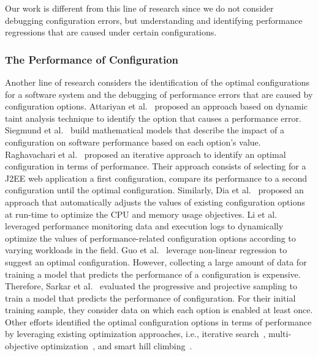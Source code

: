 Our work is different from this line of research since we do not consider debugging configuration errors, but understanding and identifying performance regressions that are caused under certain configurations.

\subsubsection{The Performance of Configuration} 

Another line of research considers the identification of the optimal configurations for a software system and the debugging of performance errors that are caused by configuration options. Attariyan et al.~\cite{RN3253} proposed an approach based on dynamic taint analysis technique to identify the option that causes a performance error. %
Siegmund et al.~\cite{RN2880} build mathematical models that describe the impact of a configuration on software performance based on each option's value. Raghavachari et al.~\cite{RN3537} proposed an iterative approach to identify an optimal configuration in terms of performance. Their approach consists of selecting for a J2EE web application a first configuration, compare its performance to a second configuration until the optimal configuration. Similarly, Dia et al.~\cite{RN3543} proposed an approach that automatically adjusts the values of existing configuration options at run-time to optimize the CPU and memory usage objectives. Li et al.~\cite{LiAutoConfig} leveraged performance monitoring data and execution logs to dynamically optimize the values of performance-related configuration options according to varying workloads in the field. Guo et al.~\cite{RN3544} leverage non-linear regression to suggest an optimal configuration. However, collecting a large amount of data for training a model that predicts the performance of a configuration is expensive. Therefore, Sarkar et al.~\cite{RN3089} evaluated the progressive and projective sampling to train a model that predicts the performance of configuration. For their initial training sample, they consider data on which each option is enabled at least once. Other efforts identified the optimal configuration options in terms of performance by leveraging existing optimization approaches, i.e., iterative search~\cite{RN3545}, multi-objective optimization~\cite{singh2016optimizing}, and smart hill climbing~\cite{RN3518}.


